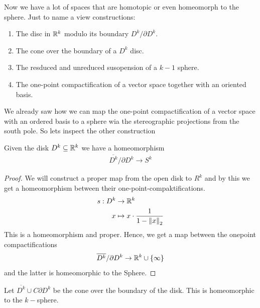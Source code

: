  
Now we have a lot of spaces that are homotopic or even homeomorph to the sphere. Just to name a view constructions:
\begin{enumerate}
	\item The disc in $\mathbb{R}^k$ modulo its boundary $D^k\slash \partial D^k$.
	\item The cone over the boundary of a $D^k$ disc. 
	\item The resduced and unreduced susopension of a $k-1$ sphere. 
	\item The one-point compactification of a vector space together with an oriented basis.
\end{enumerate}
We already saw how we can map the one-point compactification of a vector space with an ordered basis to a sphere wia the stereographic projections from the south pole. 
So lets inspect the other construction
\begin{corollary}
	Given the disk $D^k\subseteq \mathbb{R}^k$ we have a homeomorphism 
	\begin{align*}
		\overline{D^k} \slash \partial D^k\to S^k
	\end{align*}
\end{corollary}
\begin{proof}
	We will construct a proper map from the open disk to $R^k$ and by this we get a homeomorphism between their one-point-compaktifications.
	\begin{align*}
		s: D^k&\to \mathbb{R}^k\\
			x &\mapsto x \cdot \frac{1}{1-\left\lVert x\right\rVert_2}
	\end{align*}
	This is a homeomorphism and proper. Hence, we get a map between the onepoint compactifications
	\begin{align*}
		\overline{D^k}\slash \partial D^k \to \mathbb{R}^k\cup \{\infty\}
	\end{align*} and the latter is homeomorphic to the Sphere. 
\end{proof}
\begin{corollary}
Let $\overline{D^k}\cup C \partial D^k$ be the cone over the boundary of the disk. This is homeomorphic to the $k-$sphere. 
\end{corollary}
